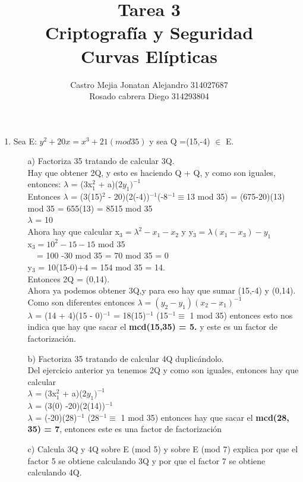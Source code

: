 \documentclass[10pt,a4paper]{article}
\author{Castro Mejia Jonatan Alejandro 314027687\\ Rosado cabrera Diego  314293804}
\title{Tarea 3 \\Criptografía y Seguridad \\ Curvas Elípticas}
\begin{document}
\maketitle
\begin{enumerate}
\item Sea E: $y^{2}+20x= x^{3}+21(mod 35)$ y sea Q =(15,-4) $\in$ E.
\begin{itemize}
\item[a)] Factoriza 35 tratando de calcular 3Q.
\\Hay que obtener 2Q, y esto es haciendo Q + Q, y como son iguales, entonces: $\lambda$ = (3x$_{1}^{2}$ + a)(2$y_{1})^{-1}$ 
\\Entonces $\lambda$ = (3(15)$^{2}$ - 20)(2(-4))$^{-1}$(-8$^{-1} \equiv $13 mod 35) = (675-20)(13) mod 35 = 655(13) = 8515 mod 35\\
$\lambda$ = 10 \\
Ahora hay que calcular x$_{3} = \lambda ^{2}- x_{1}- x_{2}$ y y$_{3} = \lambda(x_{1} - x_{3})-y_{1}$
\\x$_{3} = 10^{2}-15-15$ mod 35 
\\$~~~~~$= 100 -30 mod 35 = 70 mod 35 = 0
\\y$_{3}$ = 10(15-0)+4 = 154 mod 35 = 14.
\\Entonces 2Q = (0,14).
\\Ahora ya podemos obtener 3Q,y para eso hay que sumar (15,-4) y (0,14).
\\Como son diferentes entonces $\lambda = (y_{2} - y_{1})(x_{2} - x_{1})^{-1}$
\\$\lambda$ = (14 + 4)(15 - 0)$^{-1}$ = 18(15)$^{-1}$ (15$^{-1} \equiv$ 1 mod 35) entonces esto nos indica que hay que sacar el \textbf{mcd(15,35) = 5.} y este es un factor de factorización. 
\item[b)] Factoriza 35 tratando de calcular 4Q duplicándolo.
\\Del ejercicio anterior ya tenemos 2Q y como son iguales, entonces hay que calcular\\ $\lambda$ = (3x$_{1}^{2}$ + a)(2$y_{1})^{-1}$
\\ $\lambda$ = (3(0) -20)(2(14))$^{-1}$
\\ $\lambda$ = (-20)(28)$^{-1}$ (28$^{-1} \equiv $ 1 mod 35) entonces hay que sacar el \textbf{mcd(28, 35) = 7}, entonces este es una factor de factorización
\item[c)] Calcula 3Q y 4Q sobre E (mod 5) y sobre E (mod 7) explica por que el factor 5 se obtiene calculando 3Q y por que el factor 7 se obtiene calculando 4Q.


\end{itemize}
\end{enumerate}
\end{document}
